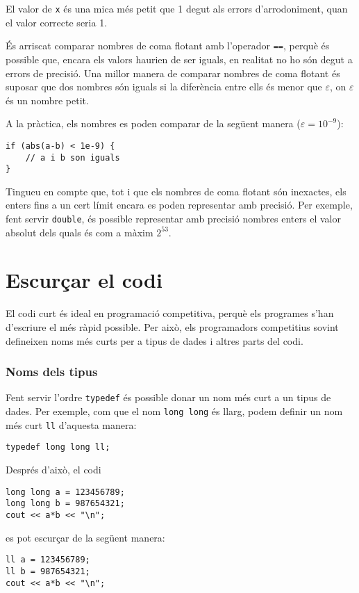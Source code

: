 El valor de \texttt{x} és una mica més petit que 1 degut
als errors d'arrodoniment, quan el valor correcte seria 1.

És arriscat comparar nombres de coma flotant
amb l'operador \texttt{==},
perquè és possible que, encara els valors haurien de
ser iguals, en realitat no ho són degut
a errors de precisió.
Una millor manera de comparar nombres de coma flotant
és suposar que dos nombres són iguals
si la diferència entre ells és menor que $\varepsilon$,
on $\varepsilon$ és un nombre petit.

A la pràctica, els nombres es poden comparar
de la següent manera ($\varepsilon=10^{-9}$):

\begin{lstlisting}
if (abs(a-b) < 1e-9) {
    // a i b son iguals
}
\end{lstlisting}

Tingueu en compte que, tot i que els nombres de coma flotant són inexactes,
els enters fins a un cert límit encara es poden
representar amb precisió.
Per exemple, fent servir \texttt{double},
és possible representar amb precisió
nombres enters el valor absolut dels quals és com a màxim $2^{53}$.

\section{Escurçar el codi}

El codi curt és ideal en programació competitiva,
perquè els programes s'han d'escriure
el més ràpid possible.
Per això, els programadors competitius sovint defineixen
noms més curts per a tipus de dades i altres parts del codi.

\subsubsection{Noms dels tipus}
Fent servir l'ordre \texttt{typedef}
és possible donar un nom més curt
a un tipus de dades.
Per exemple, com que el nom \texttt{long long} és llarg,
podem definir un nom més curt \texttt{ll} d'aquesta manera:
\begin{lstlisting}
typedef long long ll;
\end{lstlisting}
Després d'això, el codi
\begin{lstlisting}
long long a = 123456789;
long long b = 987654321;
cout << a*b << "\n";
\end{lstlisting}
es pot escurçar de la següent manera:
\begin{lstlisting}
ll a = 123456789;
ll b = 987654321;
cout << a*b << "\n";
\end{lstlisting}

